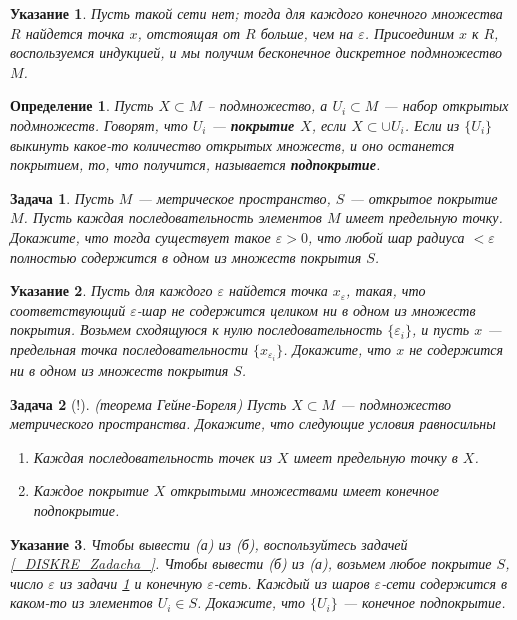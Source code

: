 \documentclass[12pt]{book}
\renewcommand{\epsilon}{\varepsilon}
\theoremstyle{upshape}
\newtheorem{zadacha}{Задача}[chapter]
\theoremstyle{generic}
\newtheorem{opredelenie}[teorema]{Определение}
\theoremstyle{upshapenonumber}
\newtheorem{ukazanie}{Указание}[section]
\newcommand{\следствие}{%
     \refstepcounter{teorema}
     {\noindent\bf Следствие \thechapter.\arabic{teorema}:\ }}
\newcommand{\пример}{%
     \refstepcounter{teorema}
     {\noindent\bf Пример \thechapter.\arabic{teorema}:\ }}
\newcommand{\лемма}{%
     \refstepcounter{teorema}
     {\noindent\bf Лемма \thechapter.\arabic{teorema}:\ }}
\newcommand{\теорема}{%
     \refstepcounter{teorema}
     {\noindent\bf Теорема \thechapter.\arabic{teorema}:\ }}
\newcommand{\утверждение}{%
     \refstepcounter{teorema}
     {\noindent\bf Утверждение \thechapter.\arabic{teorema}:\ }}
\begin{document}
{\begin{ukazanie} 
Пусть такой сети нет; тогда для каждого конечного множества
$R$ найдется точка $x$, отстоящая от $R$ больше, чем на $\epsilon$.
Присоединим $x$ к $R$, воспользуемся индукцией, и
мы получим бесконечное дискретное подмножество $M$.
\end{ukazanie}


\begin{opredelenie} Пусть $X\subset M$ --
подмножество, а $U_i\subset M$ --- набор открытых
подмножеств. Говорят, что $U_i$ --- {\bf покрытие $X$}, если $X
\subset \cup U_i$. Если из $\{U_i\}$ выкинуть какое-то количество
открытых множеств, и оно останется покрытием, то, что получится,
называется {\bf подпокрытие}.
\end{opredelenie}

 \begin{zadacha} \label{_shar_v_pokry_Zadacha_}
Пусть $M$ --- метрическое
  пространство, $S$ --- открытое покрытие $M$.
  Пусть каждая последовательность
  элементов $M$ имеет предельную точку.
  Докажите, что тогда существует такое
  $\epsilon>0$, что любой шар радиуса $<\epsilon$
  полностью содержится в одном из
  множеств покрытия $S$.
\end{zadacha}

\begin{ukazanie} 
Пусть для каждого $\epsilon$ найдется точка $x_\epsilon$,
такая, что соответствующий $\epsilon$-шар не содержится
целиком ни в одном из множеств покрытия. Возьмем
сходящуюся к нулю последовательность $\{\epsilon_i\}$,
и пусть $x$ --- предельная точка последовательности
$\{x_{\epsilon_i}\}$. Докажите, что $x$ не содержится ни в одном из
множеств покрытия $S$.
\end{ukazanie}

\begin{zadacha}[!]\label{comp.defn}
(теорема Гейне-Бореля) 
Пусть $X\subset M$ --- подмножество метрического
пространства. Докажите, что следующие условия равносильны
\begin{enumerate}
\item Каждая последовательность точек из $X$ имеет предельную точку
в $X$.

\item Каждое покрытие $X$ открытыми множествами имеет конечное
подпокрытие.
\end{enumerate}
\end{zadacha}

\begin{ukazanie} Чтобы вывести (а) из (б), воспользуйтесь
задачей \ref{_DISKRE_Zadacha_}. 
Чтобы вывести (б) из (а), возьмем любое 
покрытие $S$, число $\epsilon$ из задачи
\ref{_shar_v_pokry_Zadacha_} и конечную
$\epsilon$-сеть. Каждый из шаров
$\epsilon$-сети содержится в каком-то
из элементов $U_i\in S$. Докажите,
что $\{U_i\}$ --- конечное подпокрытие.
\end{ukazanie}

}
\end{document}
